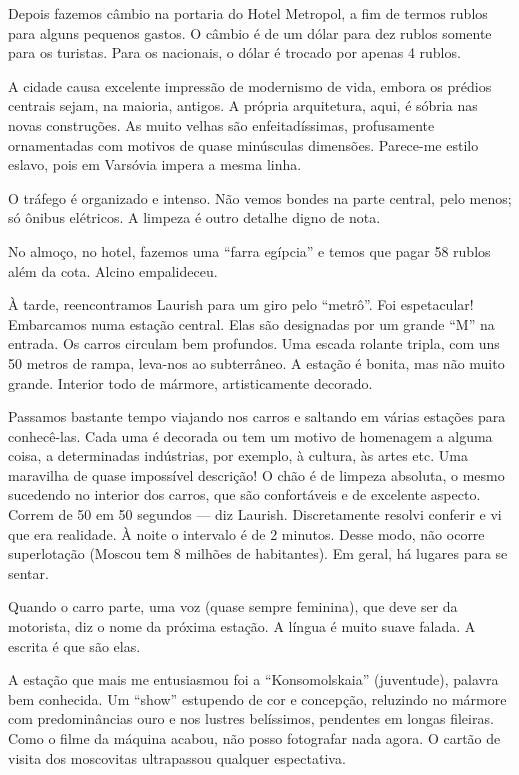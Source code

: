 Depois fazemos câmbio na portaria do Hotel Metropol, a fim de termos rublos para alguns pequenos gastos. O câmbio é de um dólar para dez rublos somente para os turistas. Para os nacionais, o dólar é trocado por apenas 4 rublos.

A cidade causa excelente impressão de modernismo de vida, embora os prédios centrais sejam, na maioria, antigos. A própria arquitetura, aqui, é sóbria nas novas construções. As muito velhas são enfeitadíssimas, profusamente ornamentadas com motivos de quase minúsculas dimensões. Parece-me estilo eslavo, pois em Varsóvia impera a mesma linha.

O tráfego é organizado e intenso. Não vemos bondes na parte central, pelo menos; só ônibus elétricos. A limpeza é outro detalhe digno de nota.

No almoço, no hotel, fazemos uma ``farra egípcia'' e temos que pagar 58 rublos além da cota. Alcino empalideceu.

À tarde, reencontramos Laurish para um giro pelo ``metrô''. Foi espetacular! Embarcamos numa estação central. Elas são designadas por um grande ``M'' na entrada. Os carros circulam bem profundos. Uma escada rolante tripla, com uns 50 metros de rampa, leva-nos ao subterrâneo. A estação é bonita, mas não muito grande. Interior todo de mármore, artisticamente decorado.

Passamos bastante tempo viajando nos carros e saltando em várias estações para conhecê-las. Cada uma é decorada ou tem um motivo de homenagem a alguma coisa, a determinadas indústrias, por exemplo, à cultura, às artes etc. Uma maravilha de quase impossível descrição! O chão é de limpeza absoluta, o mesmo sucedendo no interior dos carros, que são confortáveis e de excelente aspecto. Correm de 50 em 50 segundos --- diz Laurish. Discretamente resolvi conferir e vi que era realidade. À noite o intervalo é de 2 minutos. Desse modo, não ocorre superlotação (Moscou tem 8 milhões de habitantes). Em geral, há lugares para se sentar.

Quando o carro parte, uma voz (quase sempre feminina), que deve ser da motorista, diz o nome da próxima estação. A língua é muito suave falada. A escrita é que são elas.

A estação que mais me entusiasmou foi a ``Konsomolskaia'' (juventude), palavra bem conhecida. Um ``show'' estupendo de cor e concepção, reluzindo no mármore com predominâncias ouro e nos lustres belíssimos, pendentes em longas fileiras. Como o filme da máquina acabou, não posso fotografar nada agora. O cartão de visita dos moscovitas ultrapassou qualquer espectativa.

